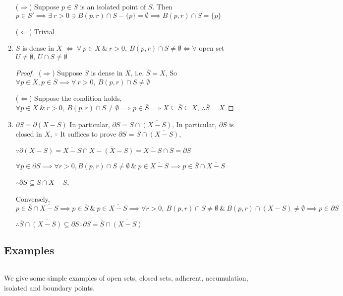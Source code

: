 \begin{enumerate}[wide,label=\textbf{(\arabic*)}]
	($\Rightarrow$) Suppose $p \in S$ is an isolated point of $S$. Then $p \in S' \implies \exists~ r > 0 \ni B(p,r) \cap S - \{p\} = \emptyset \implies B(p,r) \cap S = \{p\}$
	
	($\Leftarrow$) Trivial
	\item $S$ is dense in $X$ $\Leftrightarrow  ~\forall~p \in X ~\&~ r>0,~B(p,r) \cap S \neq \emptyset \Leftrightarrow  \forall$ open set $U \neq \emptyset,~U \cap S \neq \emptyset$
	\begin{proof}$ $
		($\Rightarrow$) Suppose $S$ is dense in $X$, i.e. $\overline{S} = X$, So $\forall p \in X, p \in \overline{S} \implies \forall~ r > 0,~B(p,r) \cap S \neq \emptyset$
		
		($\Leftarrow$) Suppose the condition holds, $\forall p \in X ~\&~ r > 0,~B(p,r) \cap S \neq \emptyset \implies p \in \overline{S} \implies X \subseteq \overline{S} \subseteq X,~\therefore \overline{S} = X$
	\end{proof}
	
	\item $\partial S = \partial(X - S)$ In particular, $\partial S = \overline{S} \cap \overline{(X - S)}$, In particular, $\partial S$ is closed in $X$, $\because$ It suffices to prove $\partial S$  = $\overline{S} \cap \overline{(X - S)}$,
	
	$\because \partial(X - S) = \overline{X - S} \cap \overline{X - (X - S)} = \overline{X - S} \cap \overline{S} = \partial S$
	
	$\forall p \in \partial S \implies \forall r > 0, B(p,r) \cap S \neq \emptyset ~\&~ p \in \overline{X - S} \implies p \in \overline{S} \cap \overline{X - S}$
	
	$\therefore \partial S \subseteq \overline{S} \cap \overline{X - S}$, 
	
	Conversely, $p \in \overline{S} \cap \overline{X - S} \implies p \in \overline{S} ~\&~ p \in \overline{X - S} \implies \forall r> 0,~B(p,r) \cap S \neq \emptyset ~\&~ B(p,r)\cap(X-S) \neq \emptyset \implies p\in \partial S$
	
	$\therefore \overline{S} \cap \overline{(X - S)} \subseteq \partial S \therefore \partial S = \overline{S} \cap \overline{(X - S)}$
\end{enumerate}

\subsection{Examples}$ $

We give some simple examples of open sets, closed sets, adherent, accumulation, isolated and boundary points.

